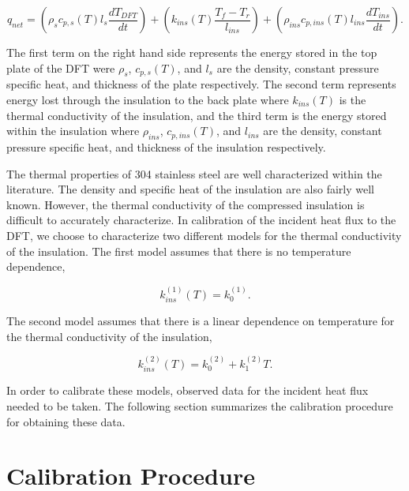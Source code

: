\documentclass[article]{proc}
\begin{document}
    \begin{equation}\label{eq:esm}
        q_{net} = \left(\rho_s c_{p,s}(T) l_s \frac{dT_{DFT}}{dt} \right) + \left( k_{ins}(T) \frac{T_f - T_r}{l_{ins}} \right) + \left(\rho_{ins} c_{p,ins}(T) l_{ins} \frac{dT_{ins}}{dt}\right).
    \end{equation}

    \noindent The first term on the right hand side represents the energy stored in the top plate of the DFT were $\rho_s$, $c_{p,s}(T)$, and $l_s$ are the density, constant pressure specific heat, and thickness of the plate respectively. The second term represents energy lost through the insulation to the back plate where $k_{ins}(T)$ is the thermal conductivity of the insulation, and the third term is the energy stored within the insulation where $\rho_{ins}$, $c_{p,ins}(T)$, and $l_{ins}$ are the density, constant pressure specific heat, and thickness of the insulation respectively. 

    The thermal properties of 304 stainless steel are well characterized within the literature. The density and specific heat of the insulation are also fairly well known. However, the thermal conductivity of the compressed insulation is difficult to accurately characterize. In calibration of the incident heat flux to the DFT, we choose to characterize two different models for the thermal conductivity of the insulation. The first model assumes that there is no temperature dependence,

    \begin{equation}\label{eq:k_ins_1}
        k_{ins}^{(1)}(T) = k_0^{(1)}.
    \end{equation}

    \noindent The second model assumes that there is a linear dependence on temperature for the thermal conductivity of the insulation,

    \begin{equation}\label{eq:k_ins_2}
        k_{ins}^{(2)}(T) = k^{(2)}_0 + k^{(2)}_1 T.
    \end{equation}

    In order to calibrate these models, observed data for the incident heat flux needed to be taken. The following section summarizes the calibration procedure for obtaining these data.
    
\section{Calibration Procedure}
\end{document}
